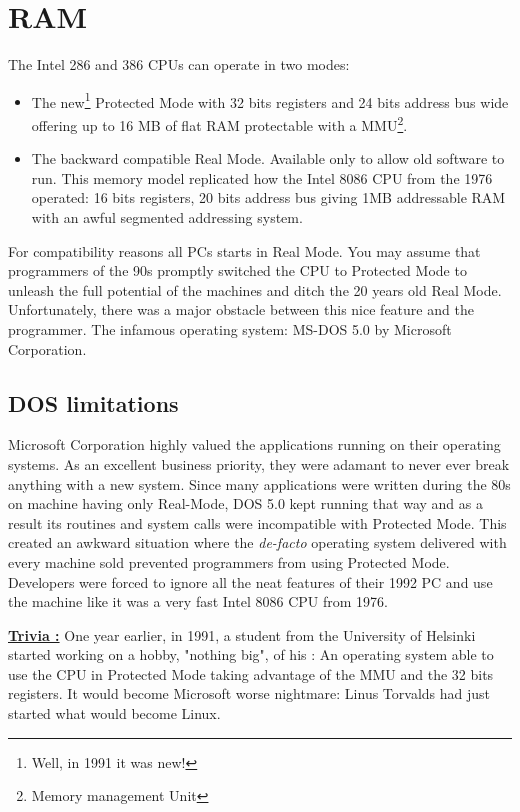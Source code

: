 \documentclass[book.tex]{subfiles}
\begin{document}
\section{RAM}
The Intel 286 and 386 CPUs can operate in two modes:\\
\par
\begin{itemize}
  \item The new\footnote{Well, in 1991 it was new!} Protected Mode with  32 bits registers and 24 bits address bus wide offering up to 16 MB of flat RAM protectable with a MMU\footnote{Memory management Unit}.
  \item The backward compatible Real Mode. Available only to allow old software to run. This memory model replicated how the Intel 8086 CPU from the 1976 operated: 16 bits registers, 20 bits address bus giving 1MB addressable RAM with an awful segmented addressing system. 
\end{itemize}
For compatibility reasons all PCs starts in Real Mode. You may assume that programmers of the 90s promptly switched the CPU to Protected Mode to unleash the full potential of the machines and ditch the 20 years old Real Mode. Unfortunately, there was a major obstacle between this nice feature and the programmer. The infamous operating system: MS-DOS 5.0 by Microsoft Corporation.
  






  \subsection{DOS limitations}
  Microsoft Corporation highly valued the applications running on their operating systems. As an excellent business priority, they were adamant to never ever break anything with a new system.  Since many applications were written during the 80s on machine having only Real-Mode, DOS 5.0 kept running that way and as a result its routines and system calls were incompatible with Protected Mode. This created an awkward situation where the \emph{de-facto} operating system delivered with every machine sold prevented programmers from using Protected Mode. Developers were forced to ignore all the neat features of their 1992 PC and use the machine like it was a very fast Intel 8086 CPU from 1976.

\bigskip

 \textbf{\underline{Trivia :}} One year earlier, in 1991, a student from the University of Helsinki started working on a hobby, "nothing big", of his : An operating system able to use the CPU in Protected Mode taking advantage of the MMU and the 32 bits registers. It would become Microsoft worse nightmare: Linus Torvalds had just started what would become Linux.
\end{document}
